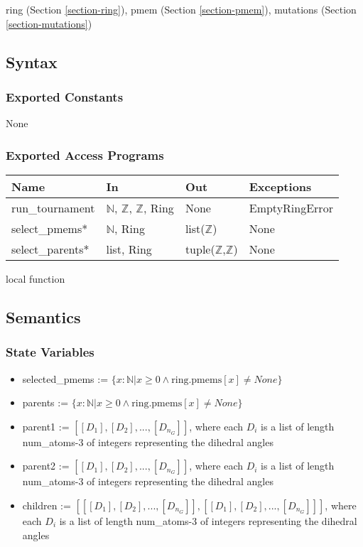 \documentclass[12pt, titlepage]{article}
\begin{document}
ring (Section \ref{section-ring}),
pmem (Section \ref{section-pmem}),
mutations (Section \ref{section-mutations})

\subsection{Syntax}

\subsubsection{Exported Constants}

None

\subsubsection{Exported Access Programs}

\begin{center}
	\begin{tabular}{p{3.5cm} p{4cm} p{4cm} p{2cm}}
		\hline
		\textbf{Name} & \textbf{In} & \textbf{Out} & \textbf{Exceptions} \\
		\hline
		run\_tournament & $\mathbb{N}$, $\mathbb{Z}$, $\mathbb{Z}$, Ring & None 
		& EmptyRingError \\
		select\_pmems* & $\mathbb{N}$, Ring & list($\mathbb{Z}$) & None \\
		select\_parents* & list, Ring & tuple($\mathbb{Z}$,$\mathbb{Z}$) & None 
		\\
		\hline
	\end{tabular}
\end{center}

\noindent * local function

\subsection{Semantics}

\subsubsection{State Variables}

\begin{itemize}
\item selected\_pmems := $\{x : \mathbb{N} | x \geq 0 \land 
\text{ring.pmems}[x] \neq None\}$
\item parents := $\{x : \mathbb{N} | x \geq 0 \land \text{ring.pmems}[x] \neq 
None\}$
\item parent1 := $[[D_1], [D_2], ..., [D_{n_G}]]$, where each 
$D_i$ is a list of length num\_atoms-3 of integers representing the dihedral 
angles
\item parent2 := $[[D_1], [D_2], ..., [D_{n_G}]]$, where each 
$D_i$ is a list of length num\_atoms-3 of integers representing the dihedral 
angles
\item children := $[[[D_1], [D_2], ..., [D_{n_G}]], [[D_1], [D_2], ..., 
[D_{n_G}]]]$, where each $D_i$ is a list of length num\_atoms-3 of integers 
representing the dihedral 
angles
\end{itemize}
\end{document}
